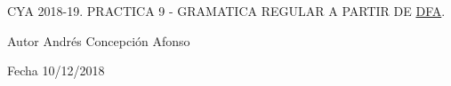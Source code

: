 C\+YA 2018-\/19. P\+R\+A\+C\+T\+I\+CA 9 -\/ G\+R\+A\+M\+A\+T\+I\+CA R\+E\+G\+U\+L\+AR A P\+A\+R\+T\+IR DE \mbox{\hyperlink{class_d_f_a}{D\+FA}}.

\begin{DoxyAuthor}{Autor}
Andrés Concepción Afonso 
\end{DoxyAuthor}
\begin{DoxyDate}{Fecha}
10/12/2018 
\end{DoxyDate}
